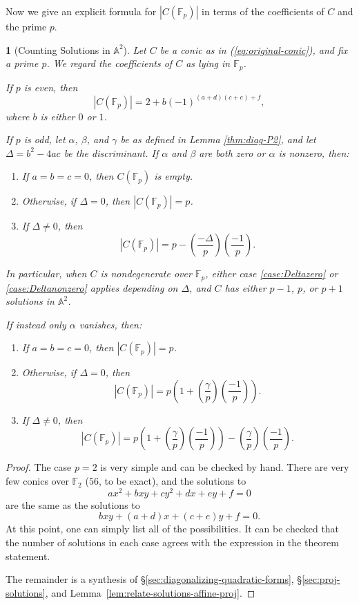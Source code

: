 \documentclass[10pt,a4paper]{amsart}
\numberwithin{equation}{section}
\numberwithin{figure}{section}
\numberwithin{table}{section}
\theoremstyle{definition}
\theoremstyle{plain}
\newtheorem{thm}{\protect\theoremname}[section]
\theoremstyle{remark}
\theoremstyle{plain}
\theoremstyle{definition}
\theoremstyle{plain}
\theoremstyle{plain}
\providecommand{\theoremname}{Theorem}
\newcommand{\legendre}[2]{\genfrac{(}{)}{}{}{#1}{#2}}
\newcommand{\A}{\mathbb{A}}
\newcommand{\F}{\mathbb{F}}
\begin{document}
	Now we give an explicit formula for $|C(\F_p)|$ in terms of the coefficients of $C$ and the prime $p$.
	
	\begin{thm}[Counting Solutions in $\A^2$]
		\label{thm:main-thm}
		Let $C$ be a conic as in (\ref{eq:original-conic}), and fix a prime $p$. We regard the coefficients of $C$ as lying in $\F_p$.
		
		If $p$ is even, then
		\begin{equation*}
		|C(\F_p)| = 2 + b(-1)^{(a + d)(c + e) + f},
		\end{equation*}
		where $b$ is either $0$ or $1$.
		
		If $p$ is odd, let $\alpha$, $\beta$, and $\gamma$ be as defined in 
		Lemma \ref{thm:diag-P2}, and let $\Delta = b^2-4ac$ be the discriminant. 
		If $\alpha$ and $\beta$ are both zero or
		$\alpha$ is nonzero, then:
		\begin{enumerate}
			\item If $a=b=c=0$, then $C(\F_p)$ is empty.
			\item\label{case:Deltazero} Otherwise, if $\Delta = 0$, then $|C(\F_p)| = p$.
			\item\label{case:Deltanonzero} If $\Delta \neq 0$, then
			\[ |C(\F_p)| = p - \legendre{-\Delta}{p}\legendre{-1}{p}. \]
		\end{enumerate}
        In particular, when $C$ is nondegenerate over $\F_p$, either case \eqref{case:Deltazero} or \eqref{case:Deltanonzero} applies depending on $\Delta$, and $C$ has either $p-1$, $p$, or $p+1$ solutions in $\A^2$.

		If instead only $\alpha$ vanishes, then:
		\begin{enumerate}
			\item If $a=b=c=0$, then $|C(\F_p)|=p$.
			\item Otherwise, if $\Delta = 0$, then
			\[ |C(\F_p)| = p\left(1 + \legendre{\gamma}{p}\legendre{-1}{p}\right). \]
			\item If $\Delta \neq 0$, then
			\[ |C(\F_p)| = p\left(1 + \legendre{\gamma}{p}\legendre{-1}{p}\right)
			- \legendre{\gamma}{p}\legendre{-1}{p}. \]
		\end{enumerate}
	\end{thm}
	\begin{proof} 
		The case $p=2$ is very simple and can be checked by hand. There are very few conics over $\F_2$ ($56$, to be exact), and the solutions to 
		\[ ax^2 + bxy + cy^2 + dx + ey + f = 0 \] 
		are the same as the solutions to 
		\[ bxy + (a+d)x + (c+e)y + f = 0.  \] 
		At this point, one can simply list all of the
		possibilities. It can be checked that the number of solutions in each case agrees with the expression in the theorem statement.
		
		The remainder is a synthesis of \S\ref{sec:diagonalizing-quadratic-forms}, 
		\S\ref{sec:proj-solutions}, and Lemma~\ref{lem:relate-solutions-affine-proj}.
	\end{proof}
	
\end{document}
